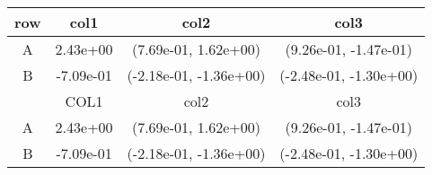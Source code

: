 \begin{tabular}{cccc}
\toprule
row&col1&col2&col3\tabularnewline
\midrule
A&2.43e+00& (7.69e-01, 1.62e+00)& (9.26e-01, -1.47e-01)\tabularnewline
B&-7.09e-01& (-2.18e-01, -1.36e+00)& (-2.48e-01, -1.30e+00)\tabularnewline
\midrule
&COL1&col2&col3\tabularnewline
\midrule
A&2.43e+00& (7.69e-01, 1.62e+00)& (9.26e-01, -1.47e-01)\tabularnewline
B&-7.09e-01& (-2.18e-01, -1.36e+00)& (-2.48e-01, -1.30e+00)\tabularnewline
\bottomrule
\end{tabular}
